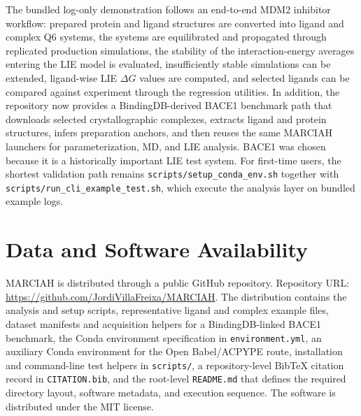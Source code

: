\documentclass[journal=jcisd8,manuscript=article]{achemso}
\begin{document}
The bundled log-only demonstration follows an end-to-end MDM2 inhibitor workflow: prepared protein and ligand structures are converted into ligand and complex Q6 systems, the systems are equilibrated and propagated through replicated production simulations, the stability of the interaction-energy averages entering the LIE model is evaluated, insufficiently stable simulations can be extended, ligand-wise LIE \(\Delta G\) values are computed, and selected ligands can be compared against experiment through the regression utilities. In addition, the repository now provides a BindingDB-derived BACE1 benchmark path that downloads selected crystallographic complexes, extracts ligand and protein structures, infers preparation anchors, and then reuses the same MARCIAH launchers for parameterization, MD, and LIE analysis. BACE1 was chosen because it is a historically important LIE test system.\cite{tounge2003bace,tounge2006bace} For first-time users, the shortest validation path remains \texttt{scripts/setup\_conda\_env.sh} together with \texttt{scripts/run\_cli\_example\_test.sh}, which execute the analysis layer on bundled example logs.

\section{Data and Software Availability}

MARCIAH is distributed through a public GitHub repository. Repository URL: \url{https://github.com/JordiVillaFreixa/MARCIAH}. The distribution contains the analysis and setup scripts, representative ligand and complex example files, dataset manifests and acquisition helpers for a BindingDB-linked BACE1 benchmark, the Conda environment specification in \texttt{environment.yml}, an auxiliary Conda environment for the Open Babel/ACPYPE route, installation and command-line test helpers in \texttt{scripts/}, a repository-level BibTeX citation record in \texttt{CITATION.bib}, and the root-level \texttt{README.md} that defines the required directory layout, software metadata, and execution sequence. The software is distributed under the MIT license.
\end{document}
